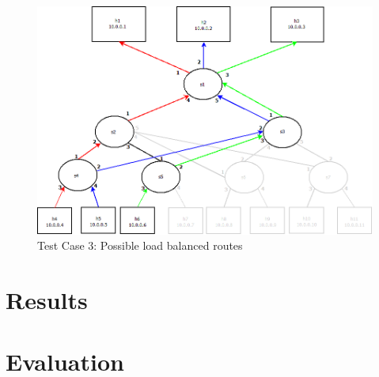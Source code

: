 \begin{figure}[h]
 \includegraphics[width=\linewidth]{images/test3.png}
 \caption{Test Case 3: Possible load balanced routes}
 \label{fig:test3}
\end{figure}

\section{Results}
\lipsum[1-1]

\section{Evaluation}
\lipsum[1-1]